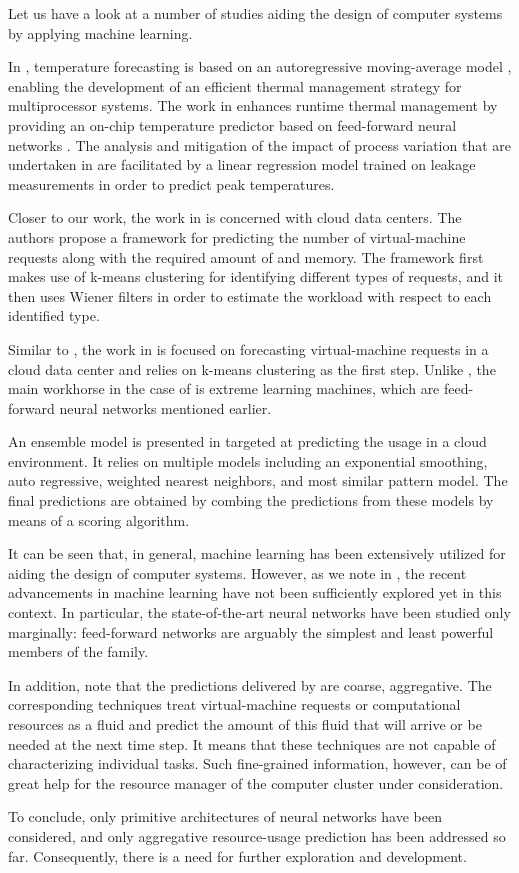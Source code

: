 Let us have a look at a number of studies aiding the design of computer systems
by applying machine learning.

In \cite{coskun2008}, temperature forecasting is based on an autoregressive
moving-average model \cite{hastie2009}, enabling the development of an efficient
thermal management strategy for multiprocessor systems. The work in
\cite{kumar2010} enhances runtime thermal management by providing an on-chip
temperature predictor based on feed-forward neural networks \cite{hastie2009}.
The analysis and mitigation of the impact of process variation that are
undertaken in \cite{juan2014} are facilitated by a linear regression model
\cite{hastie2009} trained on leakage measurements in order to predict peak
temperatures.

Closer to our work, the work in \cite{dabbagh2015} is concerned with cloud data
centers. The authors propose a framework for predicting the number of
virtual-machine requests along with the required amount of  and memory.
The framework first makes use of k-means clustering \cite{hastie2009} for
identifying different types of requests, and it then uses Wiener filters in
order to estimate the workload with respect to each identified type.

Similar to \cite{dabbagh2015}, the work in \cite{ismaeel2015} is focused on
forecasting virtual-machine requests in a cloud data center and relies on
k-means clustering as the first step. Unlike \cite{dabbagh2015}, the main
workhorse in the case of \cite{ismaeel2015} is extreme learning machines, which
are feed-forward neural networks mentioned earlier.

An ensemble model \cite{hastie2009} is presented in \cite{cao2014} targeted at
predicting the  usage in a cloud environment. It relies on multiple
models including an exponential smoothing, auto regressive, weighted nearest
neighbors, and most similar pattern model. The final predictions are obtained by
combing the predictions from these models by means of a scoring algorithm.

It can be seen that, in general, machine learning has been extensively utilized
for aiding the design of computer systems. However, as we note in
, the recent advancements in machine learning have not been
sufficiently explored yet in this context. In particular, the state-of-the-art
neural networks have been studied only marginally: feed-forward networks are
arguably the simplest and least powerful members of the family.

In addition, note that the predictions delivered by \cite{dabbagh2015,
ismaeel2015, cao2014} are coarse, aggregative. The corresponding techniques
treat virtual-machine requests or computational resources as a fluid and predict
the amount of this fluid that will arrive or be needed at the next time step. It
means that these techniques are not capable of characterizing individual tasks.
Such fine-grained information, however, can be of great help for the resource
manager of the computer cluster under consideration.

To conclude, only primitive architectures of neural networks have been
considered, and only aggregative resource-usage prediction has been addressed so
far. Consequently, there is a need for further exploration and development.
